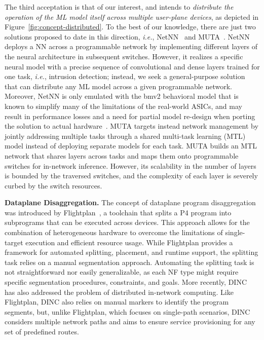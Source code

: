 \documentclass[journal]{IEEEtran}
\theoremstyle{plain} %
\newcommand{\ie}{\textit{i.e.},\xspace}
\begin{document}
The third acceptation is that of our interest, and intends to \textit{distribute the operation of the ML model itself across multiple user-plane devices}, as depicted in Figure~\ref{fig:concept-distributed}. To the best of our knowledge, there are just two solutions proposed to date in this direction, \ie NetNN~\cite{netnn-iscc24} and MUTA~\cite{muta25}. NetNN deploys a NN across a programmable network by implementing different layers of the neural architecture in subsequent switches. However, it realizes a specific neural model with a precise sequence of convolutional and dense layers trained for one task, \ie intrusion detection; instead, we seek a general-purpose solution that can distribute any ML model across a given programmable network. Moreover, NetNN is only emulated with the bmv2 behavioral model that is known to simplify many of the limitations of the real-world ASICs, and may result in performance losses and a need for partial model re-design when porting the solution to actual hardware~\cite{hyojoon21p4campus}. MUTA targets instead network management by jointly addressing multiple tasks through a shared multi-task learning (MTL) model instead of deploying separate models for each task. MUTA builds an MTL network that shares layers across tasks and maps them onto programmable switches for in-network inference. However, its scalability in the number of layers is bounded by the traversed switches, and the complexity of each layer is severely curbed by the switch resources.

\noindent\textbf{Dataplane Disaggregation.}
The concept of dataplane program disaggregation was introduced by Flightplan~\cite{sultana_flightplan_2021}, a toolchain that splits a P4 program into subprograms that can be executed across devices.
This approach allows for the combination of heterogeneous hardware to overcome the limitations of single-target execution and efficient resource usage.
While Flightplan provides a framework for automated splitting, placement, and runtime support, the splitting task relies on a manual segmentation approach.
Automating the splitting task is not straightforward nor easily generalizable, as each NF type might require specific segmentation procedures, constraints, and goals.
More recently, DINC~\cite{dinc-conext23} has also addressed the problem of distributed in-network computing. %
Like Flightplan, DINC also relies on manual markers to identify the program segments, but, unlike Flightplan, which focuses on single-path scenarios, DINC considers multiple network paths and aims to ensure service provisioning for any set of predefined routes.
\end{document}
